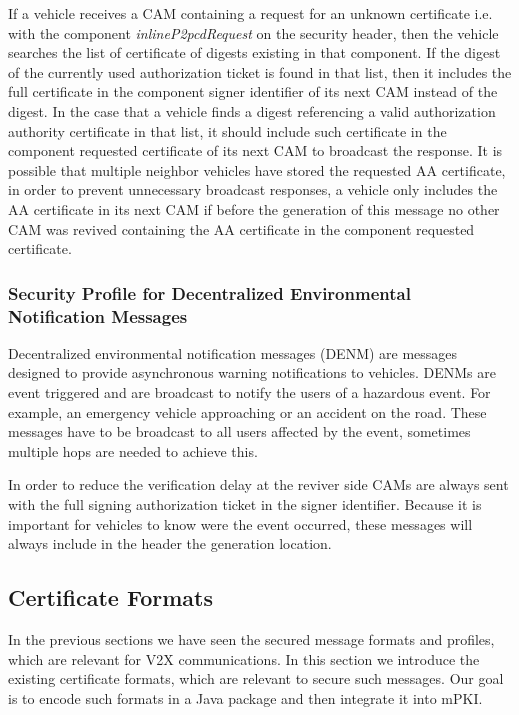 If a vehicle receives a CAM containing a request for an unknown certificate i.e. with the component \textit{inlineP2pcdRequest} on the security header, then the vehicle searches the list of certificate of digests existing in that component. If the digest of the currently used authorization ticket is found in that list, then it includes the full certificate in the component signer identifier of its next CAM instead of the digest. In the case that a vehicle finds a digest referencing a valid authorization authority certificate in that list, it should include such certificate in the component requested certificate of its next CAM to broadcast the response. It is possible that multiple neighbor vehicles have stored the requested AA certificate, in order to prevent unnecessary broadcast responses, a vehicle only includes the AA certificate in its next CAM if before the generation of this message no other CAM was revived containing the AA certificate in the component requested certificate.


\subsubsection{Security Profile for Decentralized Environmental Notification Messages} 
Decentralized environmental notification messages (DENM) are messages designed to provide asynchronous warning notifications to vehicles. DENMs are event triggered and are broadcast to notify the users of a hazardous event. For example, an emergency vehicle approaching or an accident on the road. These messages have to be broadcast to all users affected by the event, sometimes multiple hops are needed to achieve this.

In order to reduce the verification delay at the reviver side CAMs are always sent with the full signing authorization ticket in the signer identifier. Because it is important for vehicles to know were the event occurred, these messages will always include in the header the generation location.

\subsection{Certificate Formats}\label{cert_formats}
In the previous sections we have seen the secured message formats and profiles, which are relevant for V2X communications. In this section we introduce the existing certificate formats, which are relevant to secure such messages. Our goal is to encode such formats in a Java package and then integrate it into mPKI.


